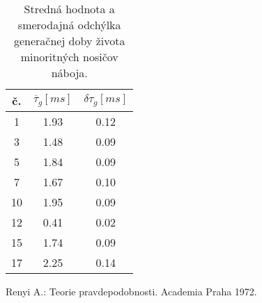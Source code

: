 \begin{table}[h!]\centering
\begin{tabular}{|c|c|c|}
\hline
č. & $\overline\tau_{g}[ms]$ & $\delta\tau_{g}[ms]$ \\ 
\hline
 1 & 1.93 & 0.12 \\
 3 & 1.48 & 0.09 \\
 5 & 1.84 & 0.09 \\
 7 & 1.67 & 0.10 \\
10 & 1.95 & 0.09 \\
12 & 0.41 & 0.02 \\
15 & 1.74 & 0.09 \\
17 & 2.25 & 0.14 \\
\hline
\end{tabular}
\captionsetup{justification=raggedright, singlelinecheck=false}
{\caption[Stredná hodnota a smerodajná odchýlka generačnej doby
    života minoritných nosičov náboja] {Stredná hodnota a smerodajná
    odchýlka generačnej doby života minoritných nosičov
    náboja.} \label{tab:7.6}}
\end{table}

\begin{thebibliography}{}
Renyi A.: Teorie pravdepodobnosti. Academia Praha 1972.
\end{thebibliography}
